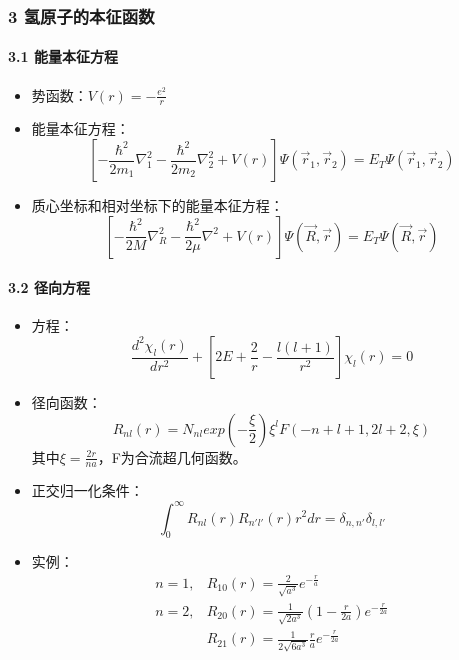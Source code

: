 \documentclass[UTF8,twocolumn]{ctexart}
\providecommand{\tightlist}{%
  \setlength{\itemsep}{0pt}\setlength{\parskip}{0pt}}
\let\oldparagraph\paragraph
\renewcommand{\paragraph}[1]{\oldparagraph{#1}\mbox{}}
\begin{document}
\hypertarget{ux6c22ux539fux5b50ux7684ux672cux5f81ux51fdux6570}{%
\subsubsection{3
氢原子的本征函数}\label{ux6c22ux539fux5b50ux7684ux672cux5f81ux51fdux6570}}

\hypertarget{ux80fdux91cfux672cux5f81ux65b9ux7a0b}{%
\paragraph{ 3.1
能量本征方程}\label{ux80fdux91cfux672cux5f81ux65b9ux7a0b}}

\begin{itemize}
\tightlist
\item
  势函数：\(V(r)=-\frac{e^2}{r}\)
\item
  能量本征方程：
  \[[-\frac{\hbar^2}{2m_1}\nabla_1^2-\frac{\hbar^2}{2m_2}\nabla_2^2+V(r)]\Psi(\vec{r}_1,\vec{r}_2)=E_T\Psi(\vec{r}_1,\vec{r}_2)\]
\item
  质心坐标和相对坐标下的能量本征方程：
  \[[-\frac{\hbar^2}{2M}\nabla_R^2-\frac{\hbar^2}{2\mu}\nabla^2+V(r)]\Psi(\vec{R},\vec{r})=E_T\Psi(\vec{R},\vec{r})\]
\end{itemize}

\hypertarget{ux5f84ux5411ux65b9ux7a0b}{%
\paragraph{ 3.2 径向方程}\label{ux5f84ux5411ux65b9ux7a0b}}

\begin{itemize}
\tightlist
\item
  方程：\[\frac{d^2\chi_l(r)}{dr^2}+[2E+\frac{2}{r}-\frac{l(l+1)}{r^2}]\chi_l(r)=0\]
\item
  径向函数：\[R_{nl}(r)=N_{nl}exp(-\frac{\xi}{2})\xi^lF(-n+l+1,2l+2,\xi)\]
  其中\(\xi=\frac{2r}{na}\)，F为合流超几何函数。
\item
  正交归一化条件：\[\int_0^\infty R_{nl}(r)R_{n'l'}(r)r^2dr=\delta_{n,n'}\delta_{l,l'}\]
\item
  实例： 
  \begin{equation*}
  \begin{array}{ll}
    n=1, & R_{10}(r)=\frac{2}{\sqrt{a^3}}e^{-\frac{r}{a}}\\
    n=2, & R_{20}(r)=\frac{1}{\sqrt{2a^3}}(1-\frac{r}{2a})e^{-\frac{r}{2a}}\\
    & R_{21}(r)=\frac{1}{2\sqrt{6a^3}}\frac{r}{a}e^{-\frac{r}{2a}}
  \end{array}
  \end{equation*}
\end{itemize}
\end{document}
